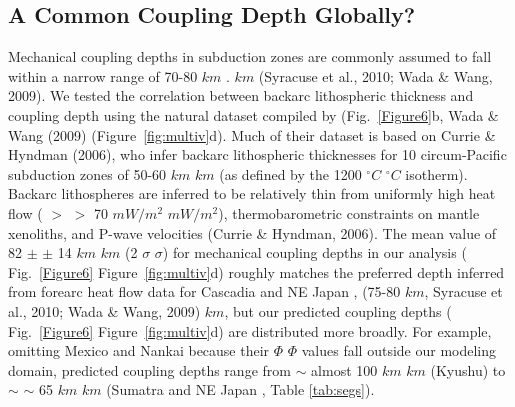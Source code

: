\documentclass[draft,linenumbers]{agujournal2018} %
\providecommand{\DIFaddtex}[1]{{\protect\color{blue} \sf #1}} %
\providecommand{\DIFdeltex}[1]{{\protect\color{red} \scriptsize #1}} %
\providecommand{\DIFaddbegin}{} %
\providecommand{\DIFaddend}{} %
\providecommand{\DIFdelbegin}{} %
\providecommand{\DIFdelend}{} %
\providecommand{\DIFadd}[1]{\texorpdfstring{\DIFaddtex{#1}}{#1}} %
\providecommand{\DIFdel}[1]{\texorpdfstring{\DIFdeltex{#1}}{}} %
\newcommand{\DIFscaledelfig}{0.3}
\newlength{\DIFdelgraphicswidth} %
\newlength{\DIFdelgraphicsheight} %
\newcommand{\DIFaddincludegraphics}[2][]{{\color{blue}\fbox{\DIFOincludegraphics[#1]{#2}}}} %
\newcommand{\DIFdelincludegraphics}[2][]{%
\sbox{\DIFdelgraphicsbox}{\DIFOincludegraphics[#1]{#2}}%
\settoboxwidth{\DIFdelgraphicswidth}{\DIFdelgraphicsbox} %
\settoboxtotalheight{\DIFdelgraphicsheight}{\DIFdelgraphicsbox} %
\scalebox{\DIFscaledelfig}{%
\parbox[b]{\DIFdelgraphicswidth}{\usebox{\DIFdelgraphicsbox}\\[-\baselineskip] \rule{\DIFdelgraphicswidth}{0em}}\llap{\resizebox{\DIFdelgraphicswidth}{\DIFdelgraphicsheight}{%
\setlength{\unitlength}{\DIFdelgraphicswidth}%
\begin{picture}(1,1)%
\thicklines\linethickness{2pt} %
{\color[rgb]{1,0,0}\put(0,0){\framebox(1,1){}}}%
{\color[rgb]{1,0,0}\put(0,0){\line( 1,1){1}}}%
{\color[rgb]{1,0,0}\put(0,1){\line(1,-1){1}}}%
\end{picture}%
}\hspace*{3pt}}} %
} %
\DeclareRobustCommand{\DIFaddbegin}{\DIFOaddbegin \let\includegraphics\DIFaddincludegraphics} %
\DeclareRobustCommand{\DIFaddend}{\DIFOaddend \let\includegraphics\DIFOincludegraphics} %
\DeclareRobustCommand{\DIFdelbegin}{\DIFOdelbegin \let\includegraphics\DIFdelincludegraphics} %
\DeclareRobustCommand{\DIFdelend}{\DIFOaddend \let\includegraphics\DIFOincludegraphics} %
\begin{document}
\clearpage

\DIFaddend \subsection{A Common Coupling Depth Globally?}
\DIFaddbegin

\DIFaddend Mechanical coupling depths in subduction zones are commonly assumed to
fall within a narrow range of 70-80 \DIFdelbegin \DIFdel{$km$ }%
\DIFdel{.}\DIFdelend \DIFaddbegin \DIFadd{\(km\) (Syracuse et al., 2010; Wada
\& Wang, 2009). }\DIFaddend We tested the correlation between backarc lithospheric
thickness and coupling depth using the natural dataset compiled by \DIFdelbegin %
\DIFdel{(Fig.~\ref{Figure6}b, }\DIFdelend \DIFaddbegin \DIFadd{Wada
\& Wang (2009) (Figure~\ref{fig:multiv}}\DIFaddend d). Much of their dataset is
based on \DIFdelbegin %
\DIFdelend \DIFaddbegin \DIFadd{Currie \& Hyndman (2006)}\DIFaddend , who infer backarc lithospheric
thicknesses for 10 circum-Pacific subduction zones of 50-60 \DIFdelbegin \DIFdel{$km$ }\DIFdelend \DIFaddbegin \DIFadd{\(km\) }\DIFaddend (as
defined by the 1200 \DIFdelbegin \DIFdel{$^{\circ}C$ }\DIFdelend \DIFaddbegin \DIFadd{\(^{\circ}C\) }\DIFaddend isotherm). Backarc lithospheres are
inferred to be relatively thin from uniformly high heat flow (\DIFdelbegin \DIFdel{$>$ }\DIFdelend \DIFaddbegin \DIFadd{\(>\) }\DIFaddend 70
\DIFdelbegin \DIFdel{$mW/m^2$}\DIFdelend \DIFaddbegin \DIFadd{\(mW/m^{2}\)}\DIFaddend ), thermobarometric constraints on mantle xenoliths, and
P-wave velocities \DIFdelbegin %
\DIFdelend \DIFaddbegin \DIFadd{(Currie \& Hyndman, 2006)}\DIFaddend . The mean value of 82
\DIFdelbegin \DIFdel{$\pm$ }\DIFdelend \DIFaddbegin \DIFadd{\(\pm\) }\DIFaddend 14 \DIFdelbegin \DIFdel{$km$ }\DIFdelend \DIFaddbegin \DIFadd{\(km\) }\DIFaddend (2\DIFdelbegin \DIFdel{$\sigma$}\DIFdelend \DIFaddbegin \DIFadd{\(\sigma\)}\DIFaddend ) for mechanical coupling depths in our
analysis (\DIFdelbegin \DIFdel{Fig.~\ref{Figure6}}\DIFdelend \DIFaddbegin \DIFadd{Figure~\ref{fig:multiv}}\DIFaddend d) roughly matches the preferred depth
inferred from forearc heat flow data for Cascadia and NE Japan \DIFdelbegin %
\DIFdel{, }\DIFdelend \DIFaddbegin \DIFadd{(75-80
\(km\), Syracuse et al., 2010; Wada \& Wang, 2009) \(km\), }\DIFaddend but our
predicted coupling depths (\DIFdelbegin \DIFdel{Fig.~\ref{Figure6}}\DIFdelend \DIFaddbegin \DIFadd{Figure~\ref{fig:multiv}}\DIFaddend d) are distributed
more broadly. For example, omitting Mexico and Nankai because their
\DIFdelbegin \DIFdel{$\Phi$ }\DIFdelend \DIFaddbegin \DIFadd{\(\Phi\) }\DIFaddend values fall outside our modeling domain, predicted coupling
depths range from \DIFdelbegin \DIFdel{$\sim$}\DIFdelend \DIFaddbegin \DIFadd{almost }\DIFaddend 100 \DIFdelbegin \DIFdel{$km$ }\DIFdelend \DIFaddbegin \DIFadd{\(km\) }\DIFaddend (Kyushu) to \DIFdelbegin \DIFdel{$\sim$}\DIFdelend \DIFaddbegin \DIFadd{\(\sim\) }\DIFaddend 65 \DIFdelbegin \DIFdel{$km$ }\DIFdelend \DIFaddbegin \DIFadd{\(km\)
}\DIFaddend (Sumatra and NE Japan\DIFaddbegin \DIFadd{, Table \ref{tab:segs}}\DIFaddend ).
\end{document}
